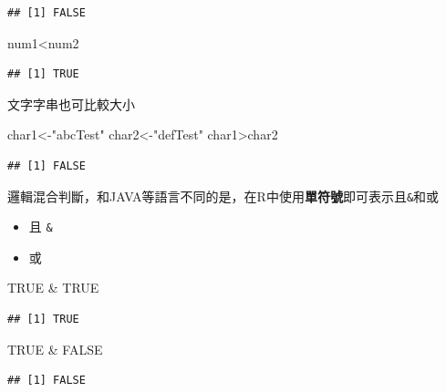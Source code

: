 \documentclass[]{book}
\newenvironment{Shaded}{\begin{snugshade}}{\end{snugshade}}
\newcommand{\StringTok}[1]{\textcolor[rgb]{0.31,0.60,0.02}{{#1}}}
\newcommand{\OtherTok}[1]{\textcolor[rgb]{0.56,0.35,0.01}{{#1}}}
\newcommand{\NormalTok}[1]{{#1}}
\providecommand{\tightlist}{%
  \setlength{\itemsep}{0pt}\setlength{\parskip}{0pt}}
\theoremstyle{definition}
\theoremstyle{definition}
\theoremstyle{remark}
\begin{document}
\begin{verbatim}
## [1] FALSE
\end{verbatim}

\begin{Shaded}
\begin{Highlighting}[]
\NormalTok{num1<num2}
\end{Highlighting}
\end{Shaded}

\begin{verbatim}
## [1] TRUE
\end{verbatim}

文字字串也可比較大小

\begin{Shaded}
\begin{Highlighting}[]
\NormalTok{char1<-}\StringTok{"abcTest"} 
\NormalTok{char2<-}\StringTok{"defTest"}
\NormalTok{char1>char2}
\end{Highlighting}
\end{Shaded}

\begin{verbatim}
## [1] FALSE
\end{verbatim}

邏輯混合判斷，和JAVA等語言不同的是，在R中使用\textbf{單符號}即可表示且\texttt{\&}和或\texttt{\textbar{}}

\begin{itemize}
\tightlist
\item
  且 \texttt{\&}
\item
  或 \texttt{\textbar{}}
\end{itemize}

\begin{Shaded}
\begin{Highlighting}[]
\OtherTok{TRUE} \NormalTok{&}\StringTok{ }\OtherTok{TRUE}
\end{Highlighting}
\end{Shaded}

\begin{verbatim}
## [1] TRUE
\end{verbatim}

\begin{Shaded}
\begin{Highlighting}[]
\OtherTok{TRUE} \NormalTok{&}\StringTok{ }\OtherTok{FALSE}
\end{Highlighting}
\end{Shaded}

\begin{verbatim}
## [1] FALSE
\end{verbatim}
\end{document}
